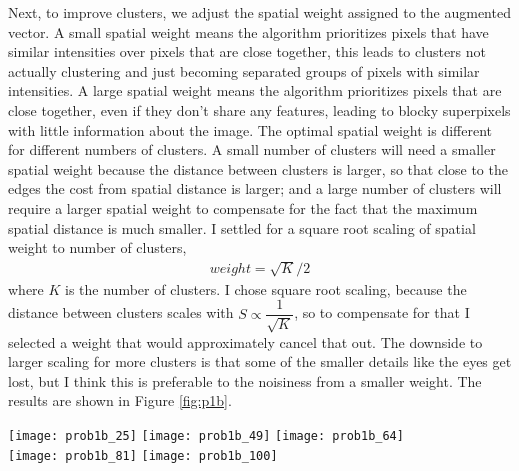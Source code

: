 \documentclass{article}
\begin{document}
Next, to improve clusters, we adjust the spatial weight assigned to the augmented vector. A small spatial weight means the algorithm prioritizes pixels that have similar intensities over pixels that are close together, this leads to clusters not actually clustering and just becoming separated groups of pixels with similar intensities. A large spatial weight means the algorithm prioritizes pixels that are close together, even if they don't share any features, leading to blocky superpixels with little information about the image. The optimal spatial weight is different for different numbers of clusters. A small number of clusters will need a smaller spatial weight because the distance between clusters is larger, so that close to the edges the cost from spatial distance is larger; and a large number of clusters will require a larger spatial weight to compensate for the fact that the maximum spatial distance is much smaller. I settled for a square root scaling of spatial weight to number of clusters, 
\begin{align}
	weight = \sqrt{K}/2
\end{align}
where $K$ is the number of clusters. I chose square root scaling, because the distance between clusters scales with $S \propto \dfrac{1}{\sqrt{K}}$, so to compensate for that I selected a weight that would approximately cancel that out. The downside to larger scaling for more clusters is that some of the smaller details like the eyes get lost, but I think this is preferable to the noisiness from a smaller weight. The results are shown in Figure \ref{fig:p1b}.

\begin{figure*}[!h]
	\centering
	\texttt{[image: prob1b\_25]}
	\texttt{[image: prob1b\_49]}
	\texttt{[image: prob1b\_64]}\\
	\texttt{[image: prob1b\_81]}
	\texttt{[image: prob1b\_100]}
	\caption{Super Pixel Clusters from SLIC Algorithm}
	\label{fig:p1b}
\end{figure*}
\end{document}
